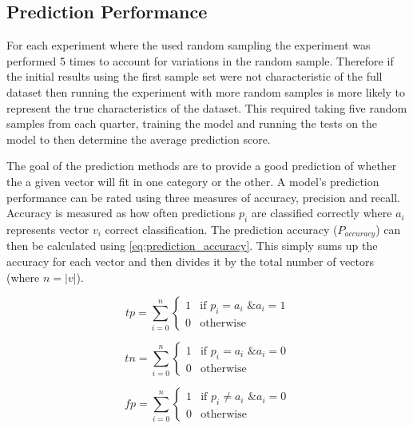 \subsection{Prediction Performance}

For each experiment where the used random sampling the experiment was performed 5 times to account for variations in the random sample. Therefore if the initial results using the first sample set were not characteristic of the full dataset then running the experiment with more random samples is more likely to represent the true characteristics of the dataset. This required taking five random samples from each quarter, training the model and running the tests on the model to then determine the average prediction score. %

The goal of the prediction methods are to provide a good prediction of whether the a given vector will fit in one category or the other. A model's prediction performance can be rated using three measures of accuracy, precision and recall. Accuracy is measured as how often predictions $p_i$ are classified correctly where $a_i$ represents vector $v_i$ correct classification. The prediction accuracy ($P_{accuracy}$) can then be calculated using \autoref{eq:prediction_accuracy}. This simply sums up the accuracy for each vector and then divides it by the total number of vectors (where $n = |v|$).

\begin{equation}
\label{eq:true_positive}
tp = \sum_{i=0}^{n}\left\{\begin{matrix}
1 & \text{if } p_i = a_i \text{ \& } a_i = 1\\ 
0 & \text{otherwise}
\end{matrix}\right.
\end{equation}

\begin{equation} 
\label{eq:true_negative}
tn = \sum_{i=0}^{n}\left\{\begin{matrix}
1 & \text{if } p_i = a_i \text{ \& } a_i = 0\\ 
0 & \text{otherwise}
\end{matrix}\right.
\end{equation}

\begin{equation}
\label{eq:false_positive}
fp = \sum_{i=0}^{n}\left\{\begin{matrix}
1 & \text{if } p_i \neq a_i \text{ \& } a_i = 0\\ 
0 & \text{otherwise}
\end{matrix}\right.
\end{equation}

